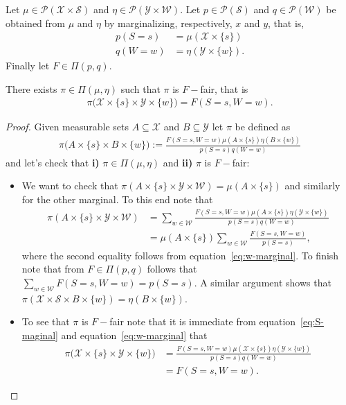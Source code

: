\documentclass[10pt,a4paper]{amsart}
\def\eqref#1{equation~\ref{#1}}
\begin{document}
\begin{lemma}\label{lemma:non_emptiness} Let $\mu\in \mathcal{P}(\mathcal{X}\times \mathcal{S})$ and $\mathcal{\eta}\in \mathcal{P}(\mathcal{Y}\times \mathcal{W})$. Let $p\in \mathcal{P}(\mathcal{S})$ and $q\in \mathcal{P}(\mathcal{W})$ be obtained from $\mu$ and $\eta$ by marginalizing, respectively, $x$ and $y$, that is,
\begin{align}\label{eq:S-maginal}
p(S=s)&=\mu(\mathcal{X}\times \lbrace s\rbrace)\\
    \label{eq:w-marginal}q(W=w)&=\eta(\mathcal{Y}\times \lbrace w\rbrace).
\end{align}
Finally let $F\in \Pi(p,q)$. 

There exists $\pi \in \Pi(\mu,\eta)$ such that $\pi$ is $F-$fair, that is
\begin{align*}
\pi\big(\mathcal{\mathcal{X}}\times \lbrace s \rbrace \times \mathcal{\mathcal{Y}}\times \lbrace w \rbrace\big)= F(S=s,W=w).
\end{align*}
\end{lemma}

\begin{proof}
Given measurable sets $A\subseteq \mathcal{X}$ and $B\subseteq \mathcal{Y}$ let $\pi$ be defined as
\begin{align*}
    \pi\big(A\times \lbrace s\rbrace \times B\times \lbrace w\rbrace\big):=\frac{F(S=s,W=w)\mu(A\times \lbrace s\rbrace )\eta(B\times \lbrace w \rbrace )}{p(S=s)q(W=w)}
\end{align*}
and let's check that \textbf{i)} $\pi\in \Pi(\mu,\eta)$ and \textbf{ii)} $\pi$ is $F-$fair:
\begin{itemize}
    \item[i)] We want to check that $\pi(A\times \lbrace s\rbrace \times \mathcal{Y}\times \mathcal{W})=\mu(A\times \lbrace s\rbrace)$ and similarly for the other marginal. To this end note that 
    \begin{align*}
      \pi(A\times \lbrace s\rbrace \times \mathcal{Y}\times \mathcal{W})&= \sum_{w\in \mathcal{W}}\frac{F(S=s,W=w)\mu(A\times \lbrace s\rbrace )\eta(\mathcal{Y}\times \lbrace w \rbrace )}{p(S=s)q(W=w)}\\
      &=\mu(A\times \lbrace s\rbrace )\sum_{w\in \mathcal{W}}\frac{F(S=s,W=w)}{p(S=s)},
    \end{align*}
    where the second equality follows from \eqref{eq:w-marginal}. To finish note that from $F\in \Pi(p,q)$  follows that $\sum_{w\in \mathcal{W}} F(S=s,W=w)=p(S=s)$. A similar argument shows that $\pi(\mathcal{X}\times \mathcal{S} \times B\times \lbrace w\rbrace )=\eta(B\times \lbrace w\rbrace)$.
    \item[ii)] To see that $\pi$ is $F-$fair note that it is immediate from \eqref{eq:S-maginal} and \eqref{eq:w-marginal} that 
    \begin{align*}
        \pi\big(\mathcal{\mathcal{X}}\times \lbrace s \rbrace \times \mathcal{\mathcal{Y}}\times \lbrace w \rbrace\big)&=\frac{F(S=s,W=w)\mu(\mathcal{X}\times \lbrace s\rbrace )\eta(\mathcal{Y}\times \lbrace w \rbrace )}{p(S=s)q(W=w)}\\
        &=F(S=s,W=w).
    \end{align*}
\end{itemize}
\end{proof}
\end{document}
